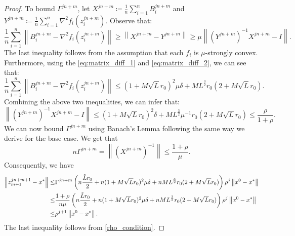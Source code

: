 \documentclass[letterpaper]{article} %
\theoremstyle{plain}
\theoremstyle{definition}
\theoremstyle{remark}
\newcommand\norm[1]{\left\lVert#1\right\rVert}
\begin{document}
\begin{proof}
    To bound $\Gamma^{j n + m}$, let $X^{j n + m} \coloneqq \frac{1}{n} \sum_{i=1}^n B_{i}^{j n + m}$ and $Y^{j n + m} \coloneqq \frac{1}{n} \sum_{i=1}^n \nabla^2 f_i (z_i^{j n + m})$. Observe that:
    \begin{equation*}
        \frac{1}{n} \sum_{i=1}^{n} \norm{B_i^{j n + m} - \nabla^2 f_i (z_i^{j n + m})} \geq \norm{X^{j n + m} - Y^{j n + m}} \geq \mu \norm{(Y^{j n + m})^{-1} X^{j n + m} - I}.
    \end{equation*}
    The last inequality follows from the assumption that each $f_i$ is $\mu$-strongly convex. Furthermore, using the \eqref{eq:matrix_diff_1} and \eqref{eq:matrix_diff_2}, we can see that:
    \begin{equation*}
         \frac{1}{n} \sum_{i=1}^{n} \norm{B_i^{j n + m} - \nabla^2 f_i (z_i^{j n + m})} \leq   (1 + M \sqrt{L} r_0 )^2 \mu \delta  +  M L^{\frac{3}{2}} r_0  (2 + M \sqrt{L} r_0 ).
    \end{equation*}
    Combining the above two inequalities, we can infer that:
    \begin{equation*}
        \norm{(Y^{j n + m})^{-1} X^{j n + m} - I} \leq  (1 + M \sqrt{L} r_0 )^2 \delta  +  M L^{\frac{3}{2}} \mu^{-1} r_0  (2 + M \sqrt{L} r_0 ) \leq \frac{\rho}{1 + \rho}.
    \end{equation*}
    We can now bound $\Gamma^{j n + m}$ using Banach's Lemma following the same way we derive for the base case. We get that 
    \begin{equation*}
        n \Gamma^{j n + m} =  \norm{(X^{j n + m})^{-1}} \leq \frac{1 + \rho}{\mu}.
    \end{equation*}
    Consequently, we have
    \begin{equation}
          \begin{split}
         \norm{z_{m+1}^{j n + m + 1} - x^*} 
        \leq & \Gamma^{j n + m}\left( n \frac{\Tilde{L} r_0 }{ 2} + n (1 + M \sqrt{L} r_0 )^2 \mu \delta  + n M L^{\frac{3}{2}} r_0  (2 + M \sqrt{L} r_0 ) \right) \rho^j \norm{x^0 - x^*} \\
        \leq & \frac{1 + \rho}{n \mu} \left( n \frac{\Tilde{L} r_0 }{ 2} + n (1 + M \sqrt{L} r_0 )^2 \mu \delta  + n M L^{\frac{3}{2}} r_0  (2 + M \sqrt{L} r_0 ) \right) \rho^j \norm{x^0 - x^*} \\
        \leq & \rho^{j + 1} \norm{x^0 - x^*}.
    \end{split}
    \label{stage_2_upper_bound}
    \end{equation}
    The last inequality follows from \eqref{rho_condition}.


\end{proof}
\end{document}
